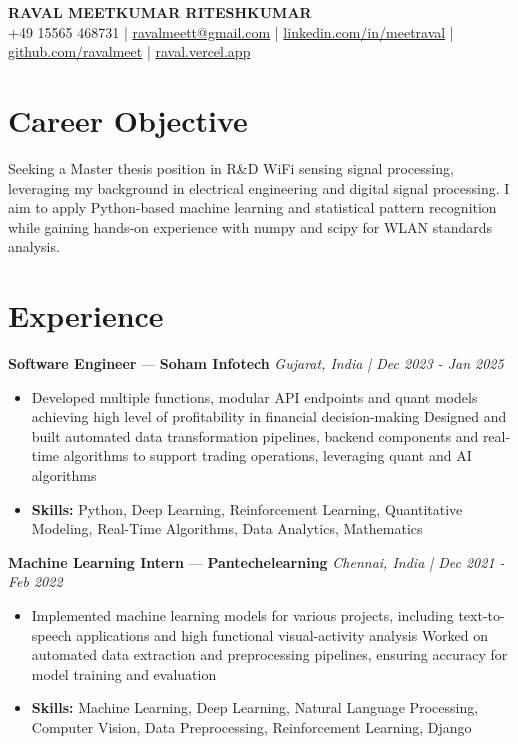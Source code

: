 \documentclass[a4paper,10pt]{article}
\begin{document}
\begin{center}
  {\Large\bfseries RAVAL MEETKUMAR RITESHKUMAR}\\[2pt]
  {\small +49 15565 468731 \;|\; \href{mailto:ravalmeett@gmail.com}{ravalmeett@gmail.com} \;|\; \href{https://www.linkedin.com/in/meetraval/}{linkedin.com/in/meetraval} \;|\; \href{https://github.com/ravalmeet}{github.com/ravalmeet} \;|\; \href{https://raval.vercel.app/}{raval.vercel.app}}
\end{center}
\vspace{-3pt}

\section*{Career Objective}
Seeking a Master thesis position in R\&D WiFi sensing signal processing, leveraging my background in electrical engineering and digital signal processing. I aim to apply Python-based machine learning and statistical pattern recognition while gaining hands-on experience with numpy and scipy for WLAN standards analysis.\par

\section*{Experience}
\textbf{Software Engineer} — \textbf{Soham Infotech} \hfill \textit{Gujarat, India \;|\; Dec 2023 - Jan 2025}\par
\vspace{1pt}
\begin{itemize}
  \item Developed multiple functions, modular API endpoints and quant models achieving high level of profitability in financial decision-making Designed and built automated data transformation pipelines, backend components and real-time algorithms to support trading operations, leveraging quant and AI algorithms
  \item \textbf{Skills:} Python, Deep Learning, Reinforcement Learning, Quantitative Modeling, Real-Time Algorithms, Data Analytics, Mathematics
\end{itemize}
\vspace{3pt}
\textbf{Machine Learning Intern} — \textbf{Pantechelearning} \hfill \textit{Chennai, India \;|\; Dec 2021 - Feb 2022}\par
\vspace{1pt}
\begin{itemize}
  \item Implemented machine learning models for various projects, including text-to-speech applications and high functional visual-activity analysis Worked on automated data extraction and preprocessing pipelines, ensuring accuracy for model training and evaluation
  \item \textbf{Skills:} Machine Learning, Deep Learning, Natural Language Processing, Computer Vision, Data Preprocessing, Reinforcement Learning, Django
\end{itemize}
\end{document}
